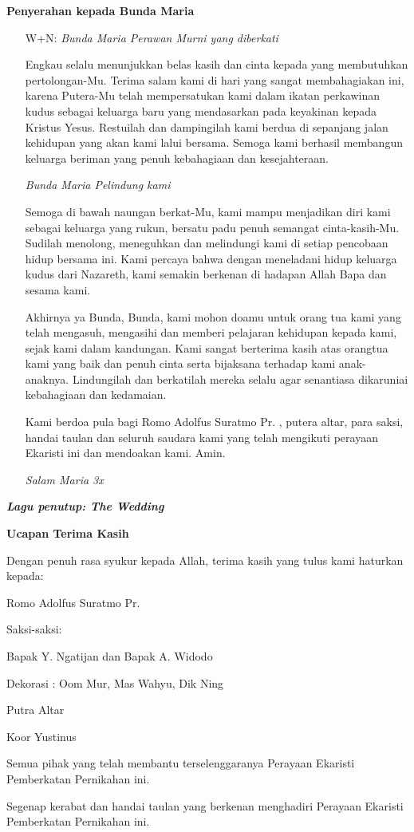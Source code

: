\documentclass[10pt]{book}
\makeatletter
\newcommand{\judul}[1]{%
  {\parindent \z@ \centering \normalfont
    \interlinepenalty\@M \Large \bfseries #1\par\nobreak \vskip 20\p@ }}
\newcommand{\subjudul}[1]{%
  {\parindent \z@ \normalfont
    \interlinepenalty\@M \bfseries #1\par\nobreak \vskip 20\p@ }}
\newcommand{\lagu}[1]{%
  {\parindent \z@ \normalfont
    \interlinepenalty\@M \bfseries \emph{#1}\par\nobreak \vskip 20\p@ }}
\newcommand{\BMP}[1]{\begin{itemize} \item[W+N:] #1 \end{itemize}}
\newcommand{\romo}{Adolfus Suratmo Pr. }
\makeatother
\begin{document}
\subjudul{Penyerahan kepada Bunda Maria}

\BMP{\emph{Bunda Maria Perawan Murni yang diberkati}

Engkau selalu menunjukkan belas kasih dan cinta kepada yang membutuhkan pertolongan-Mu. Terima salam kami di hari yang sangat membahagiakan ini, karena Putera-Mu telah mempersatukan kami dalam ikatan perkawinan kudus sebagai keluarga baru yang mendasarkan pada keyakinan kepada Kristus Yesus. Restuilah dan dampingilah kami berdua di sepanjang jalan kehidupan yang akan kami lalui bersama. Semoga kami berhasil membangun keluarga beriman yang penuh kebahagiaan dan kesejahteraan.

\emph{Bunda Maria Pelindung kami}

Semoga di bawah naungan berkat-Mu, kami mampu menjadikan diri kami sebagai keluarga yang rukun, bersatu padu penuh semangat cinta-kasih-Mu. Sudilah menolong, meneguhkan dan melindungi kami di setiap pencobaan hidup bersama ini. Kami percaya bahwa dengan meneladani hidup keluarga kudus dari Nazareth, kami semakin berkenan di hadapan Allah Bapa dan sesama kami.

Akhirnya ya Bunda, Bunda, kami mohon doamu untuk orang tua kami yang telah mengasuh, mengasihi dan memberi pelajaran kehidupan kepada kami, sejak kami dalam kandungan. Kami sangat berterima kasih atas orangtua kami yang baik dan penuh cinta serta bijaksana terhadap kami anak-anaknya.
Lindungilah dan berkatilah mereka selalu agar senantiasa dikaruniai kebahagiaan dan kedamaian.

Kami berdoa pula bagi Romo \romo, putera altar, para saksi, handai taulan dan seluruh saudara kami yang telah mengikuti perayaan Ekaristi ini dan mendoakan kami. Amin.

\emph{Salam Maria 3x}}


  
\lagu{Lagu penutup: The Wedding}

\judul{Ucapan Terima Kasih}
\begin{center}
Dengan penuh rasa syukur kepada Allah, terima kasih yang tulus kami haturkan kepada:

Romo \romo \vspace{0.5cm}

Saksi-saksi:

Bapak Y. Ngatijan dan Bapak A. Widodo\vspace{0.5cm}

Dekorasi :
Oom Mur, Mas Wahyu, Dik Ning\vspace{0.5cm}

Putra Altar\vspace{0.5cm}

Koor Yustinus\vspace{0.5cm}

Semua pihak yang telah membantu terselenggaranya Perayaan Ekaristi Pemberkatan Pernikahan ini.\vspace{0.5cm}

Segenap kerabat dan handai taulan yang berkenan menghadiri Perayaan Ekaristi Pemberkatan Pernikahan ini.
\end{center}
\end{document}
